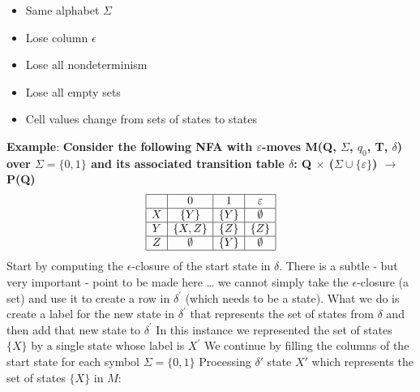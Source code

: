 \documentclass{report}
\begin{document}
\begin{itemize}
            \begin{itemize}
                \item Same alphabet $\Sigma $
                \item Lose column $\epsilon$
                \item Lose all nondeterminism
                \item Lose all empty sets
                \item Cell values change from sets of states to states
            \end{itemize}
            \bigbreak \noindent 
            \textbf{Example}:
            \textbf{Consider the following NFA with $\varepsilon$-moves M(Q, $\Sigma$, $q_0$, T, $\delta$) over $\Sigma = \{0, 1\}$ and its associated transition table $\delta$: Q $\times$ ($\Sigma \cup \{\varepsilon\}$) $\rightarrow$ P(Q)}
            \bigbreak \noindent 
            \[
                \begin{array}{|c|c|c|c|}
                    \hline
                     & 0 & 1 & \varepsilon \\
                    \hline
                    X & \{Y\} & \{Y\} & \emptyset \\
                    \hline
                    Y & \{X, Z\} & \{Z\} & \{Z\} \\
                    \hline
                    Z & \emptyset & \{Y\} & \emptyset \\
                    \hline
                \end{array}
            \]
            \bigbreak \noindent 
            Start by computing the $\epsilon$-closure of the start state in $\delta$.
            \bigbreak \noindent 
            \bigbreak \noindent 
            There is a subtle - but very important - point to be made here …
            \bigbreak \noindent 
            we cannot simply take the $\epsilon$-closure (a set) and use it to create a row in $\delta^{\prime}$ (which needs to be a state). What we do is create a label for the new state in $\delta^{\prime}$ that represents the set of states from $\delta$ and then add that new state to $\delta^{\prime}$
            \bigbreak \noindent 
            In this instance we represented the set of states $\{X\}$ by a single state whose label is $X^{\prime}$
            \bigbreak \noindent 
            We continue by filling the columns of the start state for each symbol $\Sigma = \{0, 1\}$
            \bigbreak \noindent 
            Processing $\delta'$ state $X'$ which represents the set of states $\{X\}$ in $M$:

\end{itemize}
\end{document}
